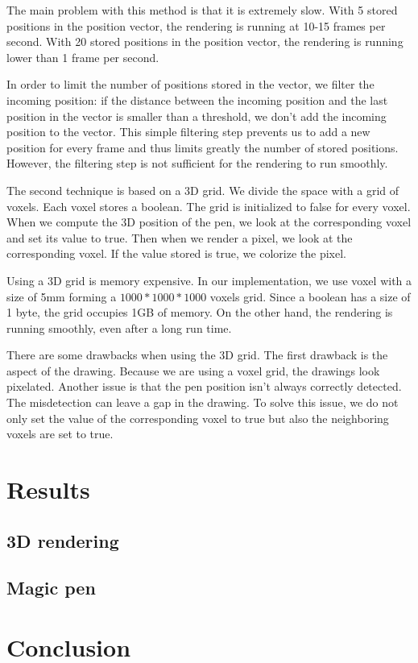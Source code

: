 \documentclass[12pt]{article}
\begin{document}
The main problem with this method is that it is extremely slow. With 5 stored positions in the position vector, the rendering is running at 10-15 frames per second. With 20 stored positions in the position vector, the rendering is running lower than 1 frame per second.

In order to limit the number of positions stored in the vector, we filter the incoming position: if the distance between the incoming position and the last position in the vector is smaller than a threshold, we don't add the incoming position to the vector. This simple filtering step prevents us to add a new position for every frame and thus limits greatly the number of stored positions. However, the filtering step is not sufficient for the rendering to run smoothly.

The second technique is based on a 3D grid. We divide the space with a grid of voxels. Each voxel stores a boolean. The grid is initialized to false for every voxel. When we compute the 3D position of the pen, we look at the corresponding voxel and set its value to true. Then when we render a pixel, we look at the corresponding voxel. If the value stored is true, we colorize the pixel.

Using a 3D grid is memory expensive. In our implementation, we use voxel with a size of 5mm forming a $1000*1000*1000$ voxels grid. Since a boolean has a size of 1 byte, the grid occupies 1GB of memory. On the other hand, the rendering is running smoothly, even after a long run time.

There are some drawbacks when using the 3D grid. The first drawback is the aspect of the drawing. Because we are using a voxel grid, the drawings look pixelated. Another issue is that the pen position isn't always correctly detected. The misdetection can leave a gap in the drawing. To solve this issue, we do not only set the value of the corresponding voxel to true but also the neighboring voxels are set to true.

\newpage
\section{Results}
\subsection{3D rendering}
\subsection{Magic pen}

\newpage
\section*{Conclusion}

\newpage
{}


\end{document}
